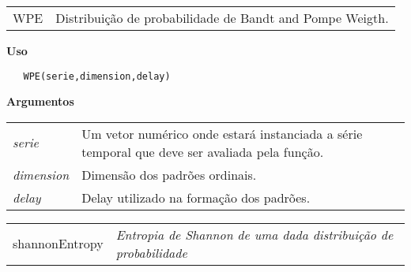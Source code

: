 \hrulefill   

\begin{table}[!ht]
\begin{center}
\begin{tabularx}{\textwidth}{X X}
\hspace{0.5cm} WPE & Distribuição de probabilidade de Bandt and Pompe Weigth.\\
\end{tabularx}
\end{center}
\end{table} 

\vspace{-0.5cm}

\hrulefill  

\vspace{0.5cm}

\textbf{Uso}

\begin{lstlisting}
   WPE(serie,dimension,delay)
\end{lstlisting}

\vspace{0.5cm}


\textbf{Argumentos}

\begin{table}[!ht]
\begin{center}
\begin{tabularx}{\textwidth}{X X}
\hspace{0.5cm} \textit{serie} \vspace{0.5cm}& Um vetor numérico onde estará instanciada a série temporal que deve ser avaliada pela função.\vspace{0.5cm}\\
\hspace{0.5cm} \textit{dimension} \vspace{0.5cm}& Dimensão dos padrões ordinais.\vspace{0.5cm}\\
\hspace{0.5cm} \textit{delay} & Delay utilizado na formação dos padrões.\\
\end{tabularx}
\end{center}
\end{table} 


\hrulefill   

\begin{table}[!ht]
\begin{center}
\begin{tabularx}{\textwidth}{ X X}
  \hspace{0.5cm} shannonEntropy & \textit{Entropia de Shannon de uma dada distribuição de probabilidade}\\
\end{tabularx}
\end{center}
\end{table} 

